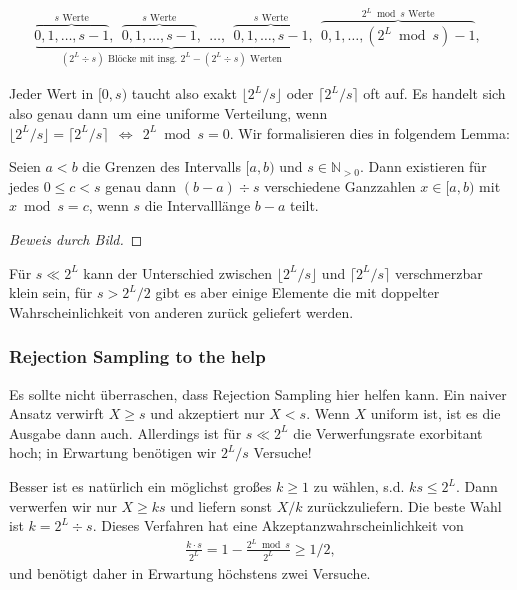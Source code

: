\begin{align}
    \underbrace{
        \overbrace{0, 1, \ldots, s{-}1}^\text{$s$ Werte},\ \
        \overbrace{0, 1, \ldots, s{-}1}^\text{$s$ Werte},\ \
        \ldots, \ \
        \overbrace{0, 1, \ldots, s{-}1}^\text{$s$ Werte}
    }_\text{$(2^L \div s)$ Blöcke mit insg. $2^L - (2^L \div s)$ Werten},\ \
    \overbrace{0, 1, \ldots, (2^L \bmod s){-}1}^\text{$2^L \bmod s$ Werte},\ \
    \label{eq:s_bloecke_in_2l}
\end{align}

Jeder Wert in $[0, s)$ taucht also exakt $\lfloor 2^L / s \rfloor$ oder $\lceil 2^L /s \rceil$ oft auf.
Es handelt sich also genau dann um eine uniforme Verteilung, wenn $\lfloor 2^L / s \rfloor = \lceil 2^L /s \rceil\ \ \Leftrightarrow\ \ 2^L \bmod s = 0$.
Wir formalisieren dies in folgendem Lemma:

\begin{lemma}\label{lem:gleichverteilt_in_ab}
    Seien $a < b$ die Grenzen des Intervalls $[a, b)$ und $s \in \mathbb N_{>0}$.
    Dann existieren für jedes $0 \le c < s$ genau dann $(b - a) \div s$ verschiedene Ganzzahlen $x \in [a, b)$ mit $x \bmod s = c$, wenn $s$ die Intervalllänge $b-a$ teilt.
\end{lemma}
\begin{proof}[Beweis durch Bild]
\end{proof}

Für $s \ll 2^L$ kann der Unterschied zwischen $\lfloor 2^L /s \rfloor$ und $\lceil 2^L / s \rceil$ verschmerzbar klein sein, für $s > 2^L / 2$ gibt es aber einige Elemente die mit doppelter Wahrscheinlichkeit von anderen zurück geliefert werden.

\subsubsection{Rejection Sampling to the help}
Es sollte nicht überraschen, dass Rejection Sampling hier helfen kann.
Ein naiver Ansatz verwirft $X \ge s$ und akzeptiert nur $X < s$.
Wenn $X$ uniform ist, ist es die Ausgabe dann auch.
Allerdings ist für $s \ll 2^L$ die Verwerfungsrate exorbitant hoch;
in Erwartung benötigen wir $2^L / s$ Versuche!

Besser ist es natürlich ein möglichst großes $k \ge 1$ zu wählen, s.d. $k s \le 2^L$.
Dann verwerfen wir nur $X \ge ks$ und liefern sonst $X / k$ zurückzuliefern.
Die beste Wahl ist $k = 2^L \div s$.
Dieses Verfahren hat eine Akzeptanzwahrscheinlichkeit von
\begin{align}
    \frac{k \cdot s}{2^L} = 1 - \frac{2^L \bmod s}{2^L} \ge 1/2,
\end{align}
und benötigt daher in Erwartung höchstens zwei Versuche.

